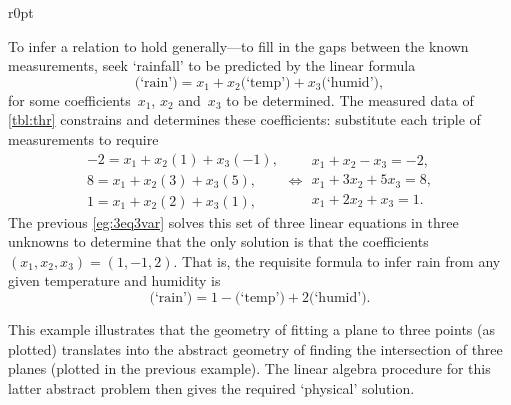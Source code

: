 \begin{example}
\begin{wrapfigure}r{0pt}
\end{wrapfigure}
\begin{solution} 
To infer a relation to hold generally---to fill in the gaps between the known measurements, seek `rainfall' to be predicted by the linear formula
\begin{equation*}
\text{(`rain')}=x_1+x_2\text{(`temp')}+x_3\text{(`humid')},
\end{equation*}
for some coefficients~\(x_1\), \(x_2\) and~\(x_3\) to be determined.
The measured data of \cref{tbl:thr} constrains and determines these coefficients:
substitute each triple of measurements to require
\begin{equation*}
\begin{array}{l}
-2=x_1+x_2(1)+x_3(-1),
\\ 8=x_1+x_2(3)+x_3(5),
\\1=x_1+x_2(2)+x_3(1),
\end{array}
\iff
\begin{array}{l}
x_1+x_2-x_3=-2,
\\ x_1+3x_2+5x_3=8,
\\x_1+2x_2+x_3=1.
\end{array}
\end{equation*}
The previous \cref{eg:3eq3var} solves this set of three linear equations in three unknowns to determine that the only solution is that the coefficients \((x_1,x_2,x_3)=(1,-1,2)\).
That is, the requisite formula to infer rain from any given temperature and humidity is 
\begin{equation*}
\text{(`rain')}=1-\text{(`temp')}+2\text{(`humid')}.
\end{equation*}

This example illustrates that the geometry of fitting a plane to three points (as plotted) translates into the abstract geometry of finding the intersection of three planes (plotted in the previous example).
The linear algebra procedure for this latter abstract problem then gives the required `physical' solution.
\end{solution}
\end{example}


